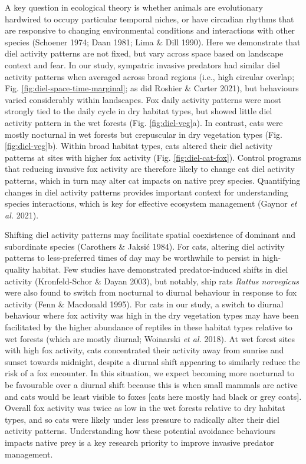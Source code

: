 \documentclass[]{elsarticle} %
\begin{document}
A key question in ecological theory is whether animals are evolutionary hardwired to occupy particular temporal niches, or have circadian rhythms that are responsive to changing environmental conditions and interactions with other species (Schoener 1974; Daan 1981; Lima \& Dill 1990). Here we demonstrate that diel activity patterns are not fixed, but vary across space based on landscape context and fear. In our study, sympatric invasive predators had similar diel activity patterns when averaged across broad regions (i.e., high circular overlap; Fig. \ref{fig:diel-space-time-marginal}; as did Roshier \& Carter 2021), but behaviours varied considerably within landscapes. Fox daily activity patterns were most strongly tied to the daily cycle in dry habitat types, but showed little diel activity pattern in the wet forests (Fig. \ref{fig:diel-veg}a). In contrast, cats were mostly nocturnal in wet forests but crepuscular in dry vegetation types (Fig. \ref{fig:diel-veg}b). Within broad habitat types, cats altered their diel activity patterns at sites with higher fox activity (Fig. \ref{fig:diel-cat-fox}). Control programs that reducing invasive fox activity are therefore likely to change cat diel activity patterns, which in turn may alter cat impacts on native prey species. Quantifying changes in diel activity patterns provides important context for understanding species interactions, which is key for effective ecosystem management (Gaynor \emph{et al.} 2021).

Shifting diel activity patterns may facilitate spatial coexistence of dominant and subordinate species (Carothers \& Jaksić 1984). For cats, altering diel activity patterns to less-preferred times of day may be worthwhile to persist in high-quality habitat. Few studies have demonstrated predator-induced shifts in diel activity (Kronfeld-Schor \& Dayan 2003), but notably, ship rats \emph{Rattus norvegicus} were also found to switch from nocturnal to diurnal behaviour in response to fox activity (Fenn \& Macdonald 1995). For cats in our study, a switch to diurnal behaviour where fox activity was high in the dry vegetation types may have been facilitated by the higher abundance of reptiles in these habitat types relative to wet forests (which are mostly diurnal; Woinarski \emph{et al.} 2018). At wet forest sites with high fox activity, cats concentrated their activity away from sunrise and sunset towards midnight, despite a diurnal shift appearing to similarly reduce the risk of a fox encounter. In this situation, we expect becoming more nocturnal to be favourable over a diurnal shift because this is when small mammals are active and cats would be least visible to foxes {[}cats here mostly had black or grey coats{]}. Overall fox activity was twice as low in the wet forests relative to dry habitat types, and so cats were likely under less pressure to radically alter their diel activity patterns. Understanding how these potential avoidance behaviours impacts native prey is a key research priority to improve invasive predator management.
\end{document}
